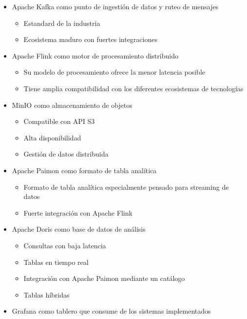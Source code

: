 \begin{itemize}
    \item Apache Kafka como punto de ingestión de datos y ruteo de mensajes
       \begin{itemize}
           \item Estandard de la industria
           \item Ecosistema maduro con fuertes integraciones
       \end{itemize}
    \item Apache Flink como motor de procesamiento distribuido
       \begin{itemize}
           \item Su modelo de procesamiento ofrece la menor latencia posible
           \item Tiene amplia compatibilidad con los diferentes ecosistemas de tecnologías
       \end{itemize}
    \item MinIO como almacenamiento de objetos
       \begin{itemize}
           \item Compatible con API S3
           \item Alta disponibilidad
           \item Gestión de datos distribuida
       \end{itemize}
    \item Apache Paimon como formato de tabla analítica
       \begin{itemize}
           \item Formato de tabla analítica especialmente pensado para streaming de datos
           \item Fuerte integración con Apache Flink
       \end{itemize}
    \item Apache Doris como base de datos de análisis
       \begin{itemize}
           \item Consultas con baja latencia
           \item Tablas en tiempo real
           \item Integración con Apache Paimon mediante un catálogo
           \item Tablas híbridas
       \end{itemize}
    \newpage
    \item Grafana como tablero que consume de los sistemas implementados
       \begin{itemize}

\end{itemize}
\end{itemize}
